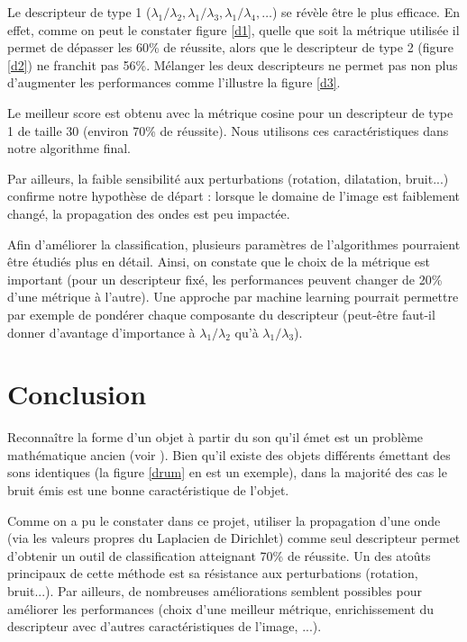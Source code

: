 \documentclass[a4paper,10pt]{article} %
\theoremstyle{definition} %
\begin{document}
Le descripteur de type 1 ($\lambda_1/\lambda_2, \lambda_1/\lambda_3, \lambda_1/\lambda_4, \dots$) se révèle être le plus efficace. En effet, comme on peut le constater figure \ref{d1}, quelle que soit la métrique utilisée il permet de dépasser les 60\% de réussite, alors que le descripteur de type 2 (figure \ref{d2}) ne franchit pas 56\%. Mélanger les deux descripteurs ne permet pas non plus d'augmenter les performances comme l'illustre la figure \ref{d3}.

Le meilleur score est obtenu avec la métrique cosine pour un descripteur de type 1 de taille 30 (environ 70\% de réussite). Nous utilisons ces caractéristiques dans notre algorithme final.

Par ailleurs, la faible sensibilité aux perturbations (rotation, dilatation, bruit...) confirme notre hypothèse de départ : lorsque le domaine de l'image est faiblement changé, la propagation des ondes est peu impactée.

Afin d'améliorer la classification, plusieurs paramètres de l'algorithmes pourraient être étudiés plus en détail. Ainsi, on constate que le choix de la métrique est important (pour un descripteur fixé, les performances peuvent changer de 20\% d'une métrique à l'autre). Une approche par machine learning pourrait permettre par exemple de pondérer chaque composante du descripteur (peut-être faut-il donner d'avantage d'importance à $\lambda_1/\lambda_2$ qu'à $\lambda_1/\lambda_3$).



\section{Conclusion}

Reconnaître la forme d'un objet à partir du son qu'il émet est un problème mathématique ancien (voir \cite{kac1966can}). Bien qu'il existe des objets différents émettant des sons identiques (la figure \ref{drum} en est un exemple), dans la majorité des cas le bruit émis est une bonne caractéristique de l'objet.

Comme on a pu le constater dans ce projet, utiliser la propagation d'une onde (via les valeurs propres du Laplacien de Dirichlet) comme seul descripteur permet d'obtenir un outil de classification atteignant 70\% de réussite. Un des atoûts principaux de cette méthode est sa résistance aux perturbations (rotation, bruit...). Par ailleurs, de nombreuses améliorations semblent possibles pour améliorer les performances (choix d'une meilleur métrique, enrichissement du descripteur avec d'autres caractéristiques de l'image, ...).
\end{document}
